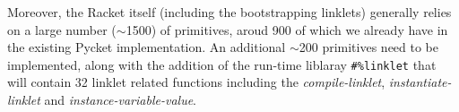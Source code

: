 Moreover, the Racket itself (including the bootstrapping linklets)
generally relies on a large number ($\sim$1500) of primitives, aroud 900
of which we already have in the existing Pycket implementation. An
additional $\sim$200 primitives need to be implemented, along with the
addition of the run-time liblaray \texttt{\#\%linklet} that will
contain 32 linklet related functions including the
\emph{compile-linklet}, \emph{instantiate-linklet} and
\emph{instance-variable-value}.